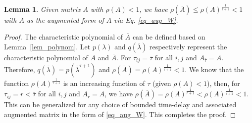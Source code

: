 \documentclass[journal]{IEEEtran}
\newtheorem{lem}{Lemma}
\begin{document}
\begin{lem} \label{lem_eig_aug}
    Given matrix $A$ with $\rho(A)<1$, we have $\rho(\overline{A})\leq \rho(A)^{\frac{1}{\overline{\tau}+1}}<1$ with  $\overline{A}$ as the augmented form of $A$ via Eq. \eqref{eq_aug_W}.
\end{lem}
\begin{proof}
	The characteristic polynomial of $\overline{A}$ can be defined based on Lemma~\ref{lem_polynom}. Let  $p(\lambda)$ and $q(\overline{\lambda})$ respectively  represent the characteristic polynomial of $A$ and $\overline{A}$. 
For $\tau_{ij} = \overline{\tau}$ for all $i,j$ and $A_{\overline{\tau}} = A$. Therefore, $ q(\overline{\lambda}) = p(\overline{\lambda}^{\overline{\tau}+1})$ and $	\rho(\overline{A}) = \rho(A)^{\frac{1}{\overline{\tau}+1}}<1.$
We know that the function $\rho(A)^{\frac{1}{{\tau}+1}}$ is an increasing function of $\tau$ (given $\rho(A)<1$), then, 
for $\tau_{ij} =r<\overline{\tau}$ for all $i,j$ and $A_{r} = A$, we have $\rho(\overline{A}) = \rho(A)^{\frac{1}{r+1}}< \rho(A)^{\frac{1}{\overline{\tau}+1}} <1.$
This can be generalized for any choice of bounded time-delay and associated augmented matrix 
in the form of \eqref{eq_aug_W}. This completes the proof.
\end{proof}



\end{document}
